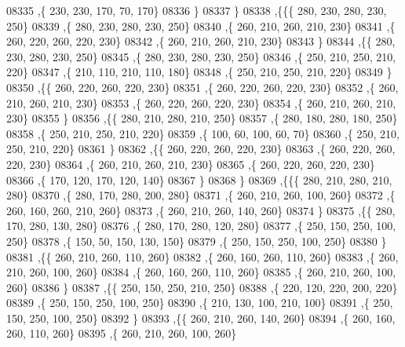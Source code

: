 \begin{DoxyCode}
08335     ,\{   230,   230,   170,    70,   170\}
08336     \}
08337    \}
08338   ,\{\{\{   280,   230,   280,   230,   250\}
08339     ,\{   280,   230,   280,   230,   250\}
08340     ,\{   260,   210,   260,   210,   230\}
08341     ,\{   260,   220,   260,   220,   230\}
08342     ,\{   260,   210,   260,   210,   230\}
08343     \}
08344    ,\{\{   280,   230,   280,   230,   250\}
08345     ,\{   280,   230,   280,   230,   250\}
08346     ,\{   250,   210,   250,   210,   220\}
08347     ,\{   210,   110,   210,   110,   180\}
08348     ,\{   250,   210,   250,   210,   220\}
08349     \}
08350    ,\{\{   260,   220,   260,   220,   230\}
08351     ,\{   260,   220,   260,   220,   230\}
08352     ,\{   260,   210,   260,   210,   230\}
08353     ,\{   260,   220,   260,   220,   230\}
08354     ,\{   260,   210,   260,   210,   230\}
08355     \}
08356    ,\{\{   280,   210,   280,   210,   250\}
08357     ,\{   280,   180,   280,   180,   250\}
08358     ,\{   250,   210,   250,   210,   220\}
08359     ,\{   100,    60,   100,    60,    70\}
08360     ,\{   250,   210,   250,   210,   220\}
08361     \}
08362    ,\{\{   260,   220,   260,   220,   230\}
08363     ,\{   260,   220,   260,   220,   230\}
08364     ,\{   260,   210,   260,   210,   230\}
08365     ,\{   260,   220,   260,   220,   230\}
08366     ,\{   170,   120,   170,   120,   140\}
08367     \}
08368    \}
08369   ,\{\{\{   280,   210,   280,   210,   280\}
08370     ,\{   280,   170,   280,   200,   280\}
08371     ,\{   260,   210,   260,   100,   260\}
08372     ,\{   260,   160,   260,   210,   260\}
08373     ,\{   260,   210,   260,   140,   260\}
08374     \}
08375    ,\{\{   280,   170,   280,   130,   280\}
08376     ,\{   280,   170,   280,   120,   280\}
08377     ,\{   250,   150,   250,   100,   250\}
08378     ,\{   150,    50,   150,   130,   150\}
08379     ,\{   250,   150,   250,   100,   250\}
08380     \}
08381    ,\{\{   260,   210,   260,   110,   260\}
08382     ,\{   260,   160,   260,   110,   260\}
08383     ,\{   260,   210,   260,   100,   260\}
08384     ,\{   260,   160,   260,   110,   260\}
08385     ,\{   260,   210,   260,   100,   260\}
08386     \}
08387    ,\{\{   250,   150,   250,   210,   250\}
08388     ,\{   220,   120,   220,   200,   220\}
08389     ,\{   250,   150,   250,   100,   250\}
08390     ,\{   210,   130,   100,   210,   100\}
08391     ,\{   250,   150,   250,   100,   250\}
08392     \}
08393    ,\{\{   260,   210,   260,   140,   260\}
08394     ,\{   260,   160,   260,   110,   260\}
08395     ,\{   260,   210,   260,   100,   260\}

\end{DoxyCode}
